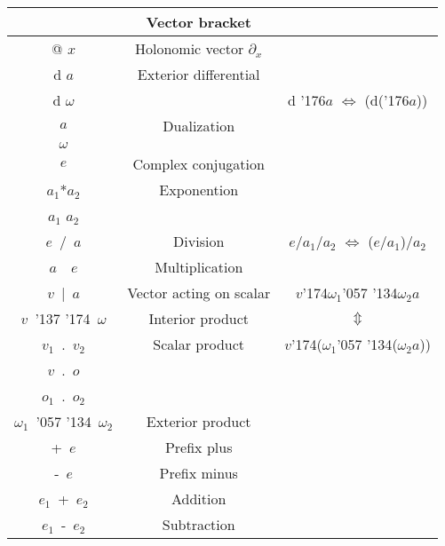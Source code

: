 \documentclass[twocolumn]{article}
\newcommand{\grgtt}{\ttfamily}
\renewcommand{\tt}{\grgtt}
\def\^{{\tt \char'136}}                     %
\newcommand{\w}{{\tt \char'057 \char'134}}  %
\newcommand{\dd}{{\tt \char'043}}           %
\newcommand{\cc}{{\tt \char'176}}           %
\newcommand{\ip}{{\tt \char'137 \char'174}} %
\newcommand{\ii}{{\tt \char'174}}           %
\begin{document}
\begin{tabular}{|c|c|c|}
\hline
{\tt [$v_1$,$v_2$]} & Vector bracket          &                             \\
\hline
{\tt @} $x$         & Holonomic vector $\partial_x$ &                       \\
\cline{1-2}
{\tt d} $a$         & Exterior differential   &                             \\
{\tt d} $\omega$    &                         &
          {\tt d} \cc$a$ $\Leftrightarrow$ {\tt (d(}\cc$a${\tt))} \\
\cline{1-2}
{\tt \dd} $a$       & Dualization             &                             \\
{\tt \dd} $\omega$  &                         &                             \\
\cline{1-2}
{\tt \cc} $e$       & Complex conjugation     &                             \\
\hline
$a_1${\tt **}$a_2$  & Exponention             &                             \\
$a_1${\tt\^} $a_2$  &                         &                             \\
\hline
$e$\ {\tt /}\ $a$   & Division                &
          $e${\tt /}$a_1${\tt /}$a_2$ $\Leftrightarrow$ {\tt (}$e${\tt /}$a_1${\tt )/}$a_2$  \\
\hline
$a$\ {\tt *}\ $e$   & Multiplication          &                                   \\
\cline{1-2}
$v$\ {\tt |}\ $a$   & Vector acting on scalar & $v$\ii$\omega_1$\w$\omega_2${\tt *}$a$ \\
\cline{1-2}
$v$\ \ip\ $\omega$  & Interior product        & $\Updownarrow$  \\
\cline{1-2}
$v_1$\ {\tt.}\ $v_2$& Scalar product          & $v$\ii{\tt (}$\omega_1$\w{\tt(}$\omega_2${\tt *}$a${\tt ))} \\
$v$\ {\tt.}\ $o$    &                         &                             \\
$o_1$\ {\tt.}\ $o_2$&                         &                             \\
\cline{1-2}
$\omega_1$\ \w\ $\omega_2$ & Exterior product &                             \\
\hline
{\tt +}\ $e$        & Prefix plus             &                             \\
\cline{1-2}
{\tt -}\ $e$        & Prefix minus            &                             \\
\cline{1-2}
$e_1$\ {\tt +}\ $e_2$ & Addition              &                             \\
\cline{1-2}
$e_1$\ {\tt -}\ $e_2$ & Subtraction           &                             \\
\hline
\end{tabular}
\end{document}
